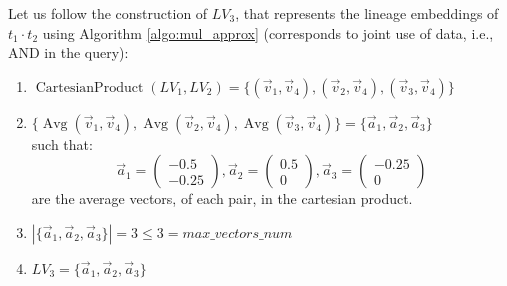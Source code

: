 \begin{example-withrun}
    Let us follow the construction of $LV_3$, that represents the lineage embeddings of $t_1 \cdot t_2$ using Algorithm \ref{algo:mul_approx} (corresponds to joint use of data, i.e., AND in the query):
    \begin{enumerate}
        \item $\operatorname{CartesianProduct}(LV_1, LV_2) = \{(\vec v_1, \vec v_4), (\vec v_2, \vec v_4), (\vec v_3, \vec v_4)\}$
        \item $\{\operatorname{Avg}(\vec v_1, \vec v_4), \operatorname{Avg}(\vec v_2, \vec v_4), \operatorname{Avg}(\vec v_3, \vec v_4)\} = \{\vec a_1, \vec a_2, \vec a_3\}$\\
        such that:
        \begin{equation*}
            \vec a_1 = \begin{pmatrix} -0.5\\ -0.25 \end{pmatrix},
            \vec a_2 = \begin{pmatrix} 0.5\\ 0 \end{pmatrix},
            \vec a_3 = \begin{pmatrix} -0.25\\ 0 \end{pmatrix}
        \end{equation*}
        are the average vectors, of each pair, in the cartesian product.
        \item $|\{\vec a_1, \vec a_2, \vec a_3\}| = 3 \leq 3 = max\_vectors\_num$
        \item $LV_3 = \{\vec a_1, \vec a_2, \vec a_3\}$
    \end{enumerate}
\end{example-withrun}




% 




